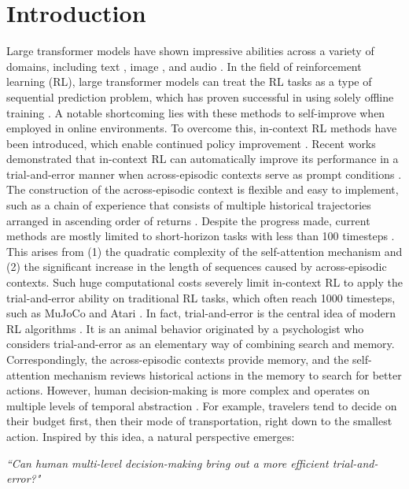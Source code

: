 \documentclass{article}
\theoremstyle{plain}
\theoremstyle{definition}
\theoremstyle{remark}
\begin{document}
\section{Introduction}
Large transformer models \cite{4} have shown impressive abilities across a variety of domains, including text \cite{5}, image \cite{6}, and audio \cite{7}.
In the field of reinforcement learning (RL), large transformer models can treat the RL tasks as a type of sequential prediction problem, which has proven successful in using solely offline training \cite{14,27}.
A notable shortcoming lies with these methods to self-improve when employed in online environments. To overcome this, in-context RL methods have been introduced, which enable continued policy improvement \cite{8}.
Recent works demonstrated that in-context RL can automatically improve its performance in a trial-and-error manner when across-episodic contexts serve as prompt conditions \cite{3}. The construction of the across-episodic context is flexible and easy to implement, such as a chain of experience that consists of multiple historical trajectories arranged in ascending order of returns \cite{1}. Despite the progress made, current methods are mostly limited to short-horizon tasks with less than 100 timesteps \cite{8}. This arises from (1) the quadratic complexity of the self-attention mechanism and (2) the significant increase in the length of sequences caused by across-episodic contexts. Such huge computational costs severely limit in-context RL to apply the trial-and-error ability on traditional RL tasks, which often reach 1000 timesteps, such as MuJoCo \cite{13} and Atari \cite{15}.
In fact, trial-and-error is the central idea of modern RL algorithms \cite{16}. It is an animal behavior originated by a psychologist \citet{17} who considers trial-and-error as an elementary way of combining search and memory. Correspondingly, the across-episodic contexts provide memory, and the self-attention mechanism reviews historical actions in the memory to search for better actions. However, human decision-making is more complex and operates on multiple levels of temporal abstraction \cite{12}. For example, travelers tend to decide on their budget first, then their mode of transportation, right down to the smallest action. Inspired by this idea, a natural perspective emerges:
\vspace{-5pt}
\begin{center}
\emph{``Can human multi-level decision-making bring out a more efficient trial-and-error?"}
\end{center}
\end{document}

